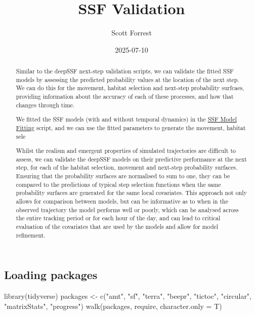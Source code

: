 \documentclass[
  letterpaper,
  DIV=11,
  numbers=noendperiod]{scrartcl}
\title{SSF Validation}
\author{Scott Forrest}
\date{2025-07-10}
\newenvironment{Shaded}{\begin{snugshade}}{\end{snugshade}}
\newcommand{\AttributeTok}[1]{\textcolor[rgb]{0.40,0.45,0.13}{#1}}
\newcommand{\FunctionTok}[1]{\textcolor[rgb]{0.28,0.35,0.67}{#1}}
\newcommand{\NormalTok}[1]{\textcolor[rgb]{0.00,0.23,0.31}{#1}}
\newcommand{\OtherTok}[1]{\textcolor[rgb]{0.00,0.23,0.31}{#1}}
\newcommand{\StringTok}[1]{\textcolor[rgb]{0.13,0.47,0.30}{#1}}
\renewcommand*\contentsname{Table of contents}
\newcommand\contentsname{Table of contents}
\begin{document}
\maketitle
\begin{abstract}
Similar to the deepSSF next-step validation scripts, we can validate the
fitted SSF models by assessing the predicted probability values at the
location of the next step. We can do this for the movement, habitat
selection and next-step probability surfcaes, providing information
about the accuracy of each of these processes, and how that changes
through time.

We fitted the SSF models (with and without temporal dynamics) in the
\href{ssf_model_fit_id.qmd}{SSF Model Fitting} script, and we can use
the fitted parameters to generate the movement, habitat sele

Whilst the realism and emergent properties of simulated trajectories are
difficult to assess, we can validate the deepSSF models on their
predictive performance at the next step, for each of the habitat
selection, movement and next-step probability surfaces. Ensuring that
the probability surfaces are normalised to sum to one, they can be
compared to the predictions of typical step selection functions when the
same probability surfaces are generated for the same local covariates.
This approach not only allows for comparison between models, but can be
informative as to when in the observed trajectory the model performs
well or poorly, which can be analysed across the entire tracking period
or for each hour of the day, and can lead to critical evaluation of the
covariates that are used by the models and allow for model refinement.
\end{abstract}

\renewcommand*\contentsname{Table of contents}
{
\setcounter{tocdepth}{3}
\tableofcontents
}

\subsection{Loading packages}\label{loading-packages}

\begin{Shaded}
\begin{Highlighting}[]
\FunctionTok{library}\NormalTok{(tidyverse)}
\NormalTok{packages }\OtherTok{\textless{}{-}} \FunctionTok{c}\NormalTok{(}\StringTok{"amt"}\NormalTok{, }\StringTok{"sf"}\NormalTok{, }\StringTok{"terra"}\NormalTok{, }\StringTok{"beepr"}\NormalTok{, }\StringTok{"tictoc"}\NormalTok{, }\StringTok{"circular"}\NormalTok{, }\StringTok{"matrixStats"}\NormalTok{, }\StringTok{"progress"}\NormalTok{)}
\FunctionTok{walk}\NormalTok{(packages, require, }\AttributeTok{character.only =}\NormalTok{ T)}
\end{Highlighting}
\end{Shaded}
\end{document}
